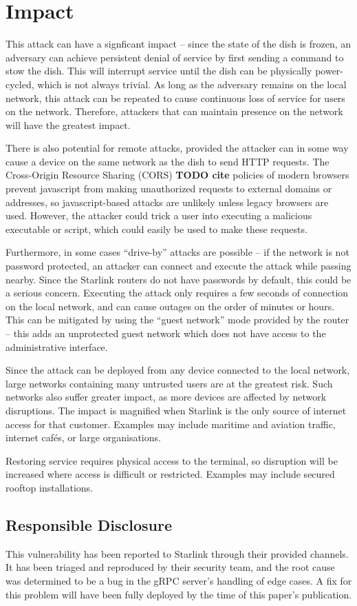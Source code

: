 \section{Impact}\label{sec:impact}

This attack can have a signficant impact -- since the state of the dish is frozen, an adversary can achieve persistent denial of service by first sending a command to stow the dish.
This will interrupt service until the dish can be physically power-cycled, which is not always trivial.
As long as the adversary remains on the local network, this attack can be repeated to cause continuous loss of service for users on the network.
Therefore, attackers that can maintain presence on the network will have the greatest impact.

There is also potential for remote attacks, provided the attacker can in some way cause a device on the same network as the dish to send HTTP requests.
The Cross-Origin Resource Sharing (CORS) \textbf{TODO cite} policies of modern browsers prevent javascript from making unauthorized requests to external domains or addresses, so javascript-based attacks are unlikely unless legacy browsers are used.
However, the attacker could trick a user into executing a malicious executable or script, which could easily be used to make these requests.

Furthermore, in some cases ``drive-by'' attacks are possible -- if the network is not password protected, an attacker can connect and execute the attack while passing nearby.
Since the Starlink routers do not have passwords by default, this could be a serious concern.
Executing the attack only requires a few seconds of connection on the local network, and can cause outages on the order of minutes or hours.
This can be mitigated by using the ``guest network'' mode provided by the router -- this adds an unprotected guest network which does not have access to the administrative interface.

Since the attack can be deployed from any device connected to the local network, large networks containing many untrusted users are at the greatest risk.
Such networks also suffer greater impact, as more devices are affected by network disruptions.
The impact is magnified when Starlink is the only source of internet access for that customer.
Examples may include maritime and aviation traffic, internet cafés, or large organisations.

Restoring service requires physical access to the terminal, so disruption will be increased where access is difficult or restricted.
Examples may include secured rooftop installations.

\subsection{Responsible Disclosure}\label{sec:responsible-disclosure}

This vulnerability has been reported to Starlink through their provided channels.
It has been triaged and reproduced by their security team, and the root cause was determined to be a bug in the gRPC server's handling of edge cases.
A fix for this problem will have been fully deployed by the time of this paper's publication.
